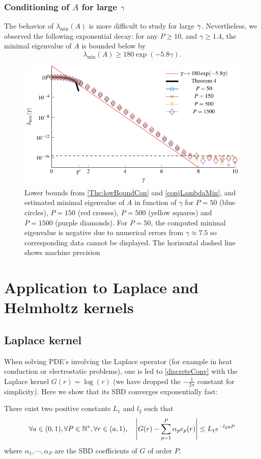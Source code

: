 \documentclass[smallextended]{svjour3}
\begin{document}
\subsubsection*{Conditioning of $A$ for large $\gamma$}																
The behavior of $\lambda_{\min}(A)$ is more difficult to study for large $\gamma$. Nevertheless, we observed the following exponential decay: for any $P \geq 10$, and $\gamma \geq 1.4$, the minimal eigenvalue of $A$ is bounded below by
\begin{equation}
	\label{conjLambdaMin}
	\lambda_{\min}(A) \geq 180 \exp(-5.8\gamma).
\end{equation}
\begin{figure}[H]
	\centering
	\includegraphics[scale = 1]{LambdaMinAsympt}
	\caption{Lower bounds from \autoref{The:lowBoundCon} and \autoref{conjLambdaMin}, and estimated minimal eigenvalue of $A$ in function of $\gamma$ for $P=50$ (blue circles), $P=150$ (red crosses), $P=500$ (yellow squares) and $P=1500$ (purple diamonds). For $P=50$, the computed minimal eigenvalue is negative due to numerical errors from $\gamma \approx 7.5$ so corresponding data cannot be displayed. The horizontal dashed line shows machine precision}
\end{figure}


																
\section{Application to Laplace and Helmholtz kernels}
\label{sec:ApplicationLaplaceHelmholtz}
\subsection{Laplace kernel}
When solving PDE's involving the Laplace operator (for example in heat conduction or electrostatic problems), one is led to \eqref{discreteConv} with the Laplace kernel $G(r) = \log(r)$ (we have dropped the $-\frac{1}{2\pi}$ constant for simplicity). Here we show that its SBD converges exponentially fast:
\begin{theorem} 
	\label{theRadialQuadLaplaceErreur}
	There exist two positive constants $L_1$ and $l_2$ such that
	\[ \forall a \in (0,1), \forall P \in \mathbb{N}^*, \forall r \in (a,1), \quad \left\lvert G(r) - \sum_{p=1}^P \alpha_p e_p(r) \right\rvert \leq L_1 e^{-l_2 a P} \]
	where $\alpha_1,\cdots,\alpha_P$ are the SBD coefficients of $G$ of order $P$.  
\end{theorem}
																		
\end{document}
